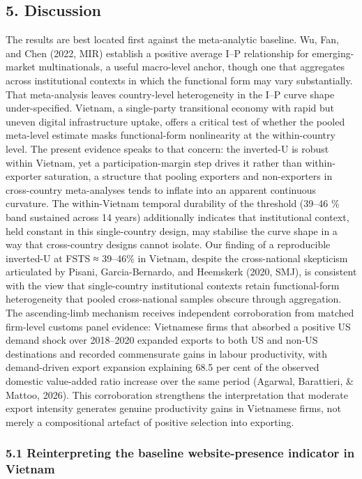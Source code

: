 \documentclass[12pt,a4paper]{article}
\begin{document}
\hypertarget{5-discussion}{%
\subsection{5. Discussion}\label{5-discussion}}

The results are best located first against the meta-analytic baseline.
Wu, Fan, and Chen (2022, MIR) establish a positive average I--P
relationship for emerging-market multinationals, a useful macro-level
anchor, though one that aggregates across institutional contexts in
which the functional form may vary substantially. That meta-analysis
leaves country-level heterogeneity in the I--P curve shape
under-specified. Vietnam, a single-party transitional economy with rapid
but uneven digital infrastructure uptake, offers a critical test of
whether the pooled meta-level estimate masks functional-form
nonlinearity at the within-country level. The present evidence speaks to
that concern: the inverted-U is robust within Vietnam, yet a
participation-margin step drives it rather than within-exporter
saturation, a structure that pooling exporters and non-exporters in
cross-country meta-analyses tends to inflate into an apparent continuous
curvature. The within-Vietnam temporal durability of the threshold
(39--46 \% band sustained across 14 years) additionally indicates that
institutional context, held constant in this single-country design, may
stabilise the curve shape in a way that cross-country designs cannot
isolate. Our finding of a reproducible inverted-U at FSTS ≈ 39--46\% in
Vietnam, despite the cross-national skepticism articulated by Pisani,
Garcia-Bernardo, and Heemskerk (2020, SMJ), is consistent with the view
that single-country institutional contexts retain functional-form
heterogeneity that pooled cross-national samples obscure through
aggregation. The ascending-limb mechanism receives independent
corroboration from matched firm-level customs panel evidence: Vietnamese
firms that absorbed a positive US demand shock over 2018--2020 expanded
exports to both US and non-US destinations and recorded commensurate
gains in labour productivity, with demand-driven export expansion
explaining 68.5 per cent of the observed domestic value-added ratio
increase over the same period (Agarwal, Barattieri, \& Mattoo, 2026).
This corroboration strengthens the interpretation that moderate export
intensity generates genuine productivity gains in Vietnamese firms, not
merely a compositional artefact of positive selection into exporting.

\hypertarget{51-reinterpreting-the-baseline-website-presence-indicator-in-vietnam}{%
\subsubsection{5.1 Reinterpreting the baseline website-presence
indicator in
Vietnam}\label{51-reinterpreting-the-baseline-website-presence-indicator-in-vietnam}}
\end{document}
